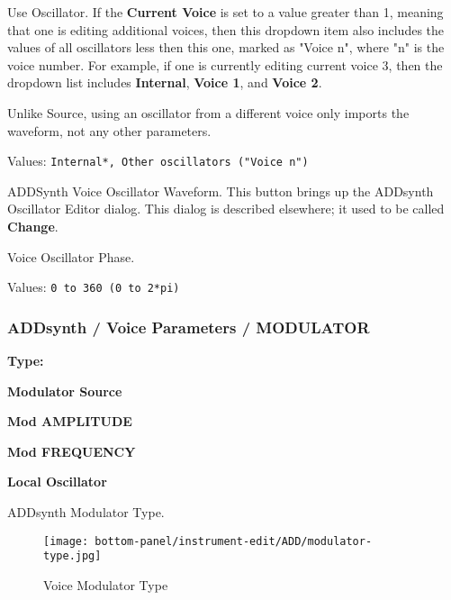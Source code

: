    Use Oscillator.
   If the \textbf{Current Voice} is set to a value greater than 1, meaning
   that one is editing additional voices, then this dropdown item also
   includes the values of all oscillators less then this one, marked as
   "Voice n", where "n" is the voice number.
   For example, if one is currently editing current voice 3,
   then the dropdown list includes \textbf{Internal}, \textbf{Voice 1}, and
   \textbf{Voice 2}.


  Unlike Source, using an oscillator from a different voice
  only imports the waveform, not any other parameters.

   Values: \texttt{Internal*, Other oscillators ("Voice n")}

   ADDSynth Voice Oscillator Waveform.
   This button brings up the ADDsynth Oscillator Editor dialog.
   This dialog is described elsewhere; it used to be called
   \textbf{Change}.

   Voice Oscillator Phase.

   Values: \texttt{0 to 360 (0 to 2*pi)}


\subsubsection{ADDsynth / Voice Parameters / MODULATOR}
\label{subsubsec:addsynth_voice_parameters_modulator}

   \begin{enumber}
      \item \textbf{Type:}
      \item \textbf{Modulator Source}
      \item \textbf{Mod AMPLITUDE}
      \item \textbf{Mod FREQUENCY}
      \item \textbf{Local Oscillator}
   \end{enumber}

   \setcounter{ItemCounter}{0}      %

   ADDsynth Modulator Type.

\begin{figure}[H]
   \centering
   \texttt{[image: bottom-panel/instrument-edit/ADD/modulator-type.jpg]}
   \caption{Voice Modulator Type}
   \label{fig:voice_modulator_type}
\end{figure}

